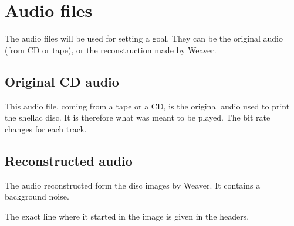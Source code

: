 \documentclass[12pt, twoside]{article}
\begin{document}
\section{Audio files}
The audio files will be used for setting a goal. They can be the original audio (from CD or tape), or the reconstruction made by Weaver.
\subsection{Original CD audio}
This audio file, coming from a tape or a CD, is the original audio used to print the shellac disc. It is therefore what was meant to be played. The bit rate changes for each track.
\subsection{Reconstructed audio}
The audio reconstructed form the disc images by Weaver. It contains a background noise.

The exact line where it started in the image is given in the headers.

%
%
%
\end{document}

